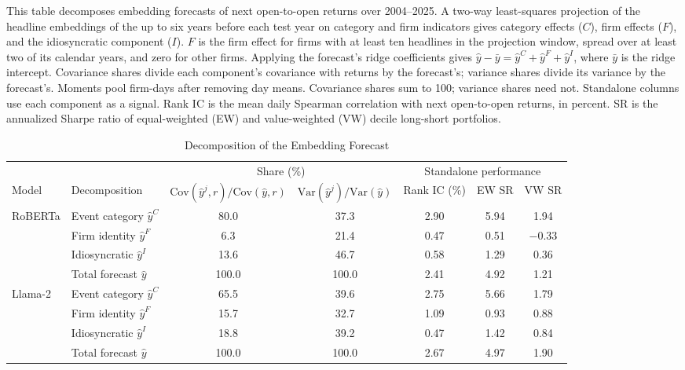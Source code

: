 \begin{table}[htbp]
\centering
\caption{Decomposition of the Embedding Forecast}
\label{tab:tab6}
\begin{minipage}{\linewidth}\footnotesize
This table decomposes embedding forecasts of next open-to-open returns over 2004--2025. A two-way least-squares projection of the headline embeddings of the up to six years before each test year on category and firm indicators gives category effects ($C$), firm effects ($F$), and the idiosyncratic component ($I$). $F$ is the firm effect for firms with at least ten headlines in the projection window, spread over at least two of its calendar years, and zero for other firms. Applying the forecast's ridge coefficients gives $\hat y-\bar y=\hat y^C+\hat y^F+\hat y^I$, where $\bar y$ is the ridge intercept. Covariance shares divide each component's covariance with returns by the forecast's; variance shares divide its variance by the forecast's. Moments pool firm-days after removing day means. Covariance shares sum to 100; variance shares need not. Standalone columns use each component as a signal. Rank IC is the mean daily Spearman correlation with next open-to-open returns, in percent. SR is the annualized Sharpe ratio of equal-weighted (EW) and value-weighted (VW) decile long-short portfolios.
\end{minipage}
\medskip

{\footnotesize
\begin{adjustbox}{max width=\linewidth, max totalheight=0.75\textheight}
\begin{tabular}{llccccc}
\toprule
\multicolumn{2}{c}{} & \multicolumn{2}{c}{Share (\%)} & \multicolumn{3}{c}{Standalone performance} \\
\cmidrule(lr){3-4} \cmidrule(lr){5-7}
Model & Decomposition & $\mathrm{Cov}(\hat y^j,r)/\mathrm{Cov}(\hat y,r)$ & $\mathrm{Var}(\hat y^j)/\mathrm{Var}(\hat y)$ & Rank IC (\%) & EW SR & VW SR \\
\midrule
RoBERTa & Event category $\hat y^C$ & \phantom{0}80.0 & \phantom{0}37.3 & 2.90 & 5.94 & \phantom{$-$}1.94 \\
 & Firm identity $\hat y^F$ & \phantom{00}6.3 & \phantom{0}21.4 & 0.47 & 0.51 & $-$0.33 \\
 & Idiosyncratic $\hat y^I$ & \phantom{0}13.6 & \phantom{0}46.7 & 0.58 & 1.29 & \phantom{$-$}0.36 \\
 & Total forecast $\hat y$ & 100.0 & 100.0 & 2.41 & 4.92 & \phantom{$-$}1.21 \\
\midrule
Llama-2 & Event category $\hat y^C$ & \phantom{0}65.5 & \phantom{0}39.6 & 2.75 & 5.66 & \phantom{$-$}1.79 \\
 & Firm identity $\hat y^F$ & \phantom{0}15.7 & \phantom{0}32.7 & 1.09 & 0.93 & \phantom{$-$}0.88 \\
 & Idiosyncratic $\hat y^I$ & \phantom{0}18.8 & \phantom{0}39.2 & 0.47 & 1.42 & \phantom{$-$}0.84 \\
 & Total forecast $\hat y$ & 100.0 & 100.0 & 2.67 & 4.97 & \phantom{$-$}1.90 \\
\bottomrule
\end{tabular}
\end{adjustbox}
}
\end{table}
